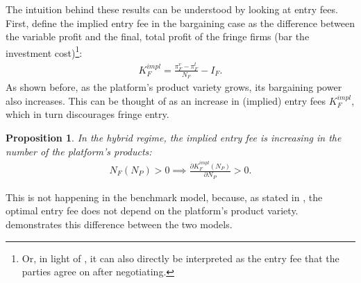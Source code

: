 \documentclass[a4paper]{article}
\newtheorem{proposition}{Proposition}
\begin{document}
The intuition behind these results can be understood by looking at entry fees.
First, define the implied entry fee in the bargaining case as the difference between the variable profit and the final, total profit of the fringe firms (bar the investment cost)\footnote{
    Or, in light of , it can also directly be interpreted as the entry fee that the parties agree on after negotiating.
}:
\begin{align*}
    K_F^{impl} = \frac{\pi_F^v - \pi_F^t}{N_F} - I_F.
\end{align*}
As shown before, as the platform's product variety grows, its bargaining power also increases.
This can be thought of as an increase in (implied) entry fees $K_F^{impl}$, which in turn discourages fringe entry.
\begin{proposition}
    \label{prop:implied_entry_fee_comparative}
    In the hybrid regime, the implied entry fee is increasing in the number of the platform's products:
    \begin{align*}
        N_F(N_P) > 0 \implies \frac{\partial K_F^{impl}(N_P)}{\partial N_P} > 0.
    \end{align*}
\end{proposition}
This is not happening in the benchmark model, because, as stated in , the optimal entry fee does not depend on the platform's product variety.
 demonstrates this difference between the two models.
\end{document}
